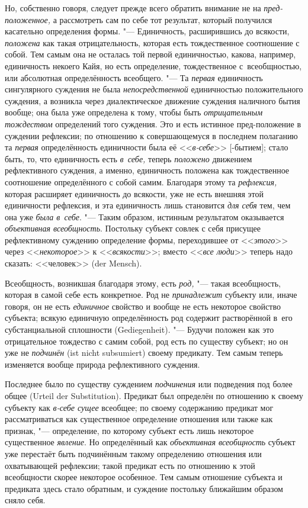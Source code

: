 Но, собственно говоря, следует прежде всего обратить внимание не на
{\em пред-положенное,} а рассмотреть сам по себе тот результат, который
получился касательно определения формы. "--- Единичность, расширившись до
всякости, {\em положена} как такая отрицательность, которая есть тождественное
соотношение с собой. Тем самым она не осталась той первой единичностью, какова,
например, единичность некоего Кайя, но есть определение, тождественное
с~всеобщностью, или абсолютная определённость всеобщего. "--- Та {\em первая}
единичность сингулярного суждения не была {\em непосредственной} единичностью
положительного суждения, а возникла через диалектическое движение суждения
наличного бытия вообще; она была уже определена к тому, чтобы быть
{\em отрицательным тождеством} определений того суждения. Это и есть истинное
пред-положение в суждении рефлексии; по отношению к совершающемуся в последнем
полаганию та {\em первая} определённость единичности была её <<{\em в-себе}>>
[-бытием]; стало быть, то, что единичность есть {\em в~себе,} теперь
{\em положено} движением рефлективного суждения, а именно, единичность положена
как тождественное соотношение определённого с собой самим. Благодаря этому та
{\em рефлексия,} которая расширяет единичность до всякости, уже не есть внешняя
этой единичности рефлексия, и эта единичность лишь становится {\em для себя}
тем, чем она уже {\em была в~себе}. "--- Таким образом, истинным результатом
оказывается {\em объективная всеобщность}. Постольку субъект совлек с себя
присущее рефлективному суждению определение формы, переходившее от
<<{\em этого}>> через <<{\em некоторое}>> к <<{\em всякости}>>; вместо
<<{\em все люди}>> теперь надо сказать: <<человек>> (der Mensch).

Всеобщность, возникшая благодаря этому, есть {\em род,} "--- такая всеобщность,
которая в самой себе есть конкретное. Род не {\em принадлежит} субъекту или,
иначе говоря, он не есть {\em единичное} свойство и вообще не есть некоторое
свойство субъекта; всякую единичную определённость род содержит растворённой
в~его субстанциальной сплошности (Gedie\-genheit). "--- Будучи положен как это
отрицательное тождество с самим собой, род есть по существу субъект; но он уже
не {\em подчинён} (ist nicht subsumiert) своему предикату. Тем самым теперь
изменяется вообще природа рефлективного суждения.

Последнее было по существу суждением {\em подчинения} или подведения под более
общее (Urteil der Substi\-tution). Предикат был определён по отношению к
своему субъекту как {\em в-себе сущее} всеобщее; по своему содержанию предикат
мог рассматриваться как существенное определение отношения или также как
признак, "--- определение, по которому субъект есть лишь некоторое существенное
{\em явление}. Но определённый как {\em объективная всеобщность} субъект уже
перестаёт быть подчинённым такому определению отношения или охватывающей
рефлексии; такой предикат есть по отношению к этой всеобщности скорее некоторое
особенное. Тем самым отношение субъекта и предиката здесь стало обратным, и
суждение постольку ближайшим образом сняло себя.

